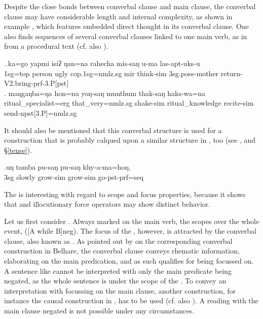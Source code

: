 Despite the close bonds between converbal clause and main clause, the converbal clause may have considerable length and internal complexity, as shown in example \Next[a], which features embedded direct thought in its converbal clause. One also finds sequences of several converbal clauses linked to one main verb, as in \Next[b] from a procedural text (cf. also \Last[b]).

	\ex.\ag.ka=go   yapmi isiʔ ŋan=na   rahecha mis-saŋ  u-ma    las-apt-uks-u\\
	{\sc 1sg=top} person ugly   {\sc cop.1sg=nmlz.sg}  {\sc mir} think{\sc -sim} {\sc 3sg.poss-}mother   return{\sc -V2.bring-prf-3.P[pst]}\\
	 
	\bg. maŋgaŋba=ŋa   hon=na      yoŋ-saŋ     munthum   thak-saŋ         haks-wa=na\\
		ritual\_specialist{\sc =erg} that\_very{\sc =nmlz.sg} shake{\sc -sim} ritual\_knowledge recite{\sc -sim} send{\sc -npst[3.P]=nmlz.sg}\\
		 
	
It should also be mentioned that this converbal structure is  used for a   construction that is probably calqued upon a similar structure in , too (see \Next, and §\ref{tense}).

\exg.uŋ tamba  pu-saŋ     pu-saŋ    khy-a-ma=hoŋ,  \\
		{\sc 3sg} slowly grow{\sc -sim} grow{\sc -sim} go{\sc [3sg]-pst-prf=seq}\\
		 	


The  is interesting with regard to scope and focus properties, because it shows that  and illocutionary force operators may show distinct behavior. 

Let us first consider . Always marked on the main verb, the  scopes over the whole event, ([A while B]{\sc neg}). The focus of the , however, is attracted by the converbal clause, also known as  \citep{Horn1989A-natural}. As pointed out by \citet{Bickel1993Belhare} on the corresponding converbal construction in Belhare, the converbal clause conveys rhematic information, elaborating on the main predication, and as such qualifies for being focussed on. A sentence like \Next[a] cannot be interpreted with only the main predicate being  negated, as the whole sentence is under the  scope  of the . To convey an interpretation with  focussing on the main clause, another construction, for instance the causal construction in \Next[b], has to be used (cf. also \citet{Bierkandtetal_Scope}). A reading with the main clause negated is not possible under any circumstances.

